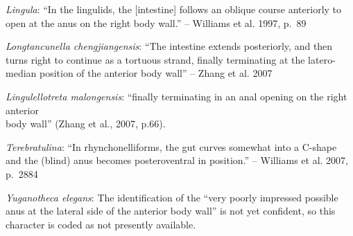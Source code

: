 \documentclass[]{book}
\theoremstyle{definition}
\theoremstyle{definition}
\theoremstyle{definition}
\theoremstyle{remark}
\begin{document}
\emph{Lingula}: ``In the lingulids, the {[}intestine{]} follows an
oblique course anteriorly to open at the anus on the right body wall.''
-- Williams et al. 1997, p.~89

\emph{Longtancunella chengjiangensis}: ``The intestine extends
posteriorly, and then turns right to continue as a tortuous strand,
finally terminating at the latero-median position of the anterior body
wall'' -- Zhang et al. 2007

\emph{Lingulellotreta malongensis}: ``finally terminating in an anal
opening on the right anterior\\
body wall'' (Zhang et al., 2007, p.66).

\emph{Terebratulina}: ``In rhynchonelliforms, the gut curves somewhat
into a C-shape and the (blind) anus becomes posteroventral in
position.'' -- Williams et al. 2007,\\
p.~2884

\emph{Yuganotheca elegans}: The identification of the ``very poorly
impressed possible anus at the lateral side of the anterior body wall''
is not yet confident, so this character is coded as not presently
available.
\end{document}
